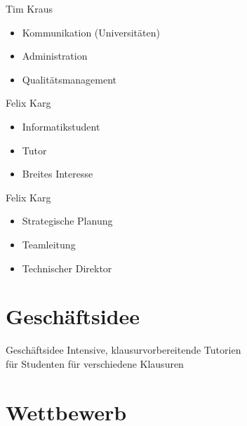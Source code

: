 \begin{frame}[c]{Tim Kraus}
    \begin{itemize}[<+(1)->]
    \item Kommunikation (Universitäten)
    \item Administration
    \item Qualitätsmanagement
    \end{itemize}
\end{frame}

\begin{frame}[c]{Felix Karg}
    \begin{itemize}[<+(1)->]
    \item Informatikstudent
    \item Tutor
    \item Breites Interesse
    \end{itemize}
\end{frame}


\begin{frame}[c]{Felix Karg}
    \begin{itemize}[<+(1)->]
    \item Strategische Planung
    \item Teamleitung
    \item Technischer Direktor
    \end{itemize}
\end{frame}



\section{Geschäftsidee}

\begin{frame}[c]{Geschäftsidee}
    \Large
    Intensive, klausurvorbereitende Tutorien \\
    für Studenten für verschiedene Klausuren
\end{frame}

% 
% 

\section{Wettbewerb}

